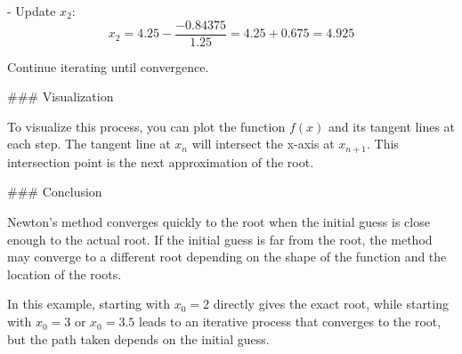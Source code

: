    - Update \( x_2 \):
     \[
     x_2 = 4.25 - \frac{-0.84375}{1.25} = 4.25 + 0.675 = 4.925
     \]

   Continue iterating until convergence.

### Visualization

To visualize this process, you can plot the function \( f(x) \) and its tangent lines at each step. The tangent line at \( x_n \) will intersect the x-axis at \( x_{n+1} \). This intersection point is the next approximation of the root.

### Conclusion

Newton's method converges quickly to the root when the initial guess is close enough to the actual root. If the initial guess is far from the root, the method may converge to a different root depending on the shape of the function and the location of the roots.

In this example, starting with \( x_0 = 2 \) directly gives the exact root, while starting with \( x_0 = 3 \) or \( x_0 = 3.5 \) leads to an iterative process that converges to the root, but the path taken depends on the initial guess.